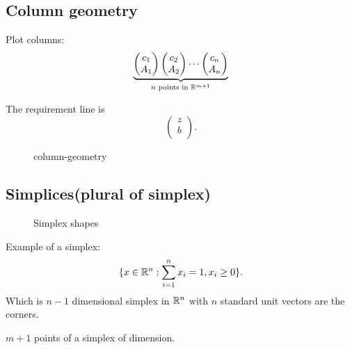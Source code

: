 \subsection{Column geometry}
Plot columns:
\[
	\underbrace{
		\begin{pmatrix}
			c_1 \\
			A_1 \\
		\end{pmatrix}
		\begin{pmatrix}
			c_2 \\
			A_2 \\
		\end{pmatrix}
		\cdots
		\begin{pmatrix}
			c_n \\
			A_n \\
		\end{pmatrix}}_{n \text{ points in }\mathbb{\MakeUppercase{R}}^{m+1}}
\]

The requirement line is
\[
	\begin{pmatrix}
		z \\
		b \\
	\end{pmatrix}.
\]

\begin{figure}[H]
	\centering
	\caption{column-geometry}
	\label{fig:column-geometry}
\end{figure}

\subsection{Simplices(plural of simplex)}
\begin{figure}[H]
	\centering
	\caption{Simplex shapes}
	\label{fig:simplex}
\end{figure}

\begin{eg}
	Example of a simplex:
	\[
		\{x\in \mathbb{\MakeUppercase{R}}^n : \sum\limits_{i=1}^{n} x_i = 1, x_i \geq 0\}.
	\]
	Which is \(n-1\) dimensional simplex in \(\mathbb{\MakeUppercase{R}}^n\) with \(n\)
	standard unit vectors are the corners.
\end{eg}

\begin{note}
	\(m+1\) points of a simplex of dimension.
\end{note}

